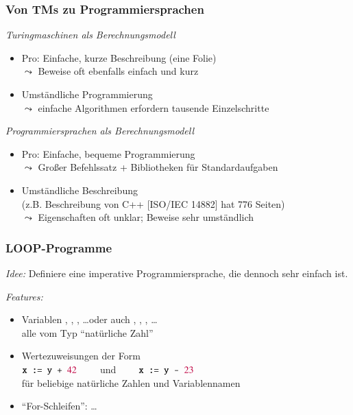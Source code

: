 \documentclass[onlymath]{beamer}
\begin{document}
\begin{frame}\frametitle{Von TMs zu Programmiersprachen}

\emph{Turingmaschinen als Berechnungsmodell}
\begin{itemize}
\item \alert{Pro:} Einfache, kurze Beschreibung (eine Folie)\\
	$\leadsto$ Beweise oft ebenfalls einfach und kurz
\item {} Umständliche Programmierung\\
	$\leadsto$ einfache Algorithmen erfordern tausende Einzelschritte
\end{itemize}
\bigskip\pause

\emph{Programmiersprachen als Berechnungsmodell}
\begin{itemize}
\item \alert{Pro:} Einfache, bequeme Programmierung\\
	$\leadsto$ Großer Befehlssatz + Bibliotheken für Standardaufgaben
\item {} Umständliche Beschreibung\\
	(z.B. Beschreibung von C++ [ISO/IEC 14882] hat 776 Seiten)\\
	$\leadsto$ Eigenschaften oft unklar; Beweise sehr umständlich
\end{itemize}

\end{frame}

\begin{frame}\frametitle{LOOP-Programme}

\emph{Idee:} Definiere eine imperative Programmiersprache, die dennoch sehr einfach ist.
\bigskip

\emph{Features:}
\begin{itemize}
\item Variablen , , , \ldots oder auch , , , \ldots\\
alle vom Typ ``natürliche Zahl''
\item Wertezuweisungen der Form\\[1ex]
\mbox{}\hfill%
$\texttt{x} \texttt{ := } \texttt{y} \texttt{ + } \textcolor{purple}{42}\qquad$ und $\qquad\texttt{x} \texttt{ := } \texttt{y} \texttt{ - } \textcolor{purple}{23}$\hfill\mbox{}\\[1ex]
%
für beliebige natürliche Zahlen und Variablennamen
\item ``For-Schleifen'':  \ldots{} \SEndLoop
\end{itemize}

\end{frame}
\end{document}
